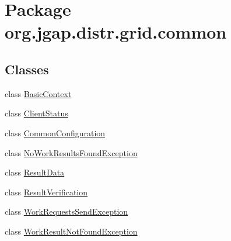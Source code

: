 \hypertarget{namespaceorg_1_1jgap_1_1distr_1_1grid_1_1common}{\section{Package org.\-jgap.\-distr.\-grid.\-common}
\label{namespaceorg_1_1jgap_1_1distr_1_1grid_1_1common}
}
\subsection*{Classes}
\begin{DoxyCompactItemize}
\item 
class \hyperlink{classorg_1_1jgap_1_1distr_1_1grid_1_1common_1_1_basic_context}{Basic\-Context}
\item 
class \hyperlink{classorg_1_1jgap_1_1distr_1_1grid_1_1common_1_1_client_status}{Client\-Status}
\item 
class \hyperlink{classorg_1_1jgap_1_1distr_1_1grid_1_1common_1_1_common_configuration}{Common\-Configuration}
\item 
class \hyperlink{classorg_1_1jgap_1_1distr_1_1grid_1_1common_1_1_no_work_results_found_exception}{No\-Work\-Results\-Found\-Exception}
\item 
class \hyperlink{classorg_1_1jgap_1_1distr_1_1grid_1_1common_1_1_result_data}{Result\-Data}
\item 
class \hyperlink{classorg_1_1jgap_1_1distr_1_1grid_1_1common_1_1_result_verification}{Result\-Verification}
\item 
class \hyperlink{classorg_1_1jgap_1_1distr_1_1grid_1_1common_1_1_work_requests_send_exception}{Work\-Requests\-Send\-Exception}
\item 
class \hyperlink{classorg_1_1jgap_1_1distr_1_1grid_1_1common_1_1_work_result_not_found_exception}{Work\-Result\-Not\-Found\-Exception}
\end{DoxyCompactItemize}

